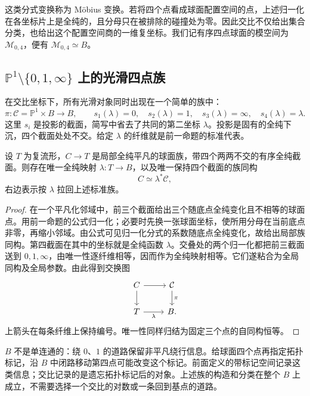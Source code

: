 这类分式变换称为 Möbius 变换。若将四个点看成球面配置空间的点，上述归一化在各坐标片上是全纯的，且分母只在被排除的碰撞处为零。因此交比不仅给出集合分类，也给出这个配置空间商的一维复坐标。我们记有序四点球面的模空间为 \(\mathcal M_{0,4}\)，便有 \(\mathcal M_{0,4}\simeq B\)。

\subsection{\texorpdfstring{\(\mathbb P^1\setminus\{0,1,\infty\}\) 上的光滑四点族}{P¹∖\{0,1,∞\} 上的光滑四点族}}
\label{g4:subsec:0605:02}
在交比坐标下，所有光滑对象同时出现在一个简单的族中：
\[
	\pi:\mathcal C=\mathbb P^1\times B\longrightarrow B,
	\qquad s_1(\lambda)=0,\quad s_2(\lambda)=1,\quad
	s_3(\lambda)=\infty,\quad s_4(\lambda)=\lambda.
\]
这里 \(s_i\) 是投影的截面，简写中省去了共同的第二坐标 \(\lambda\)。投影是固有的全纯下沉，四个截面处处不交。给定 \(\lambda\) 的纤维就是前一命题的标准代表。

\begin{proposition}
	\label{g4:prop:0605:family-normalization}
	设 \(T\) 为复流形，\(C\to T\) 是局部全纯平凡的球面族，带四个两两不交的有序全纯截面。则存在唯一全纯映射 \(\lambda:T\to B\)，以及唯一保持四个截面的族同构
	\[
		C\simeq\lambda^*\mathcal C,
	\]
	右边表示按 \(\lambda\) 拉回上述标准族。
\end{proposition}
\begin{proof}
	在一个平凡化邻域中，前三个截面给出三个随底点全纯变化且不相等的球面点。用前一命题的公式归一化；必要时先换一张球面坐标，使所用分母在当前底点非零，再缩小邻域。由公式可见归一化分式的系数随底点全纯变化，故给出局部族同构。第四截面在其中的坐标就是全纯函数 \(\lambda\)。交叠处的两个归一化都把前三截面送到 \(0,1,\infty\)，由唯一性逐纤维相等，因而作为全纯映射相等。它们遂粘合为全局同构及全局参数。由此得到交换图
	\[
		\begin{tikzcd}
			C \arrow[r] \arrow[d] & \mathcal C \arrow[d,"\pi"] \\
			T \arrow[r,"\lambda"'] & B.
		\end{tikzcd}
	\]
	上箭头在每条纤维上保持编号。唯一性同样归结为固定三个点的自同构恒等。
\end{proof}

\(B\) 不是单连通的：绕 \(0\)、\(1\) 的道路保留非平凡绕行信息。给球面四个点再指定拓扑标记，沿 \(B\) 中闭路移动第四点可能改变这个标记。前面定义的带标记空间记录这类信息；交比记录的是遗忘拓扑标记后的对象。上述族的构造和分类在整个 \(B\) 上成立，不需要选择一个交比的对数或一条回到基点的道路。

